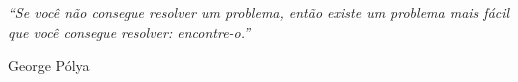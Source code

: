 \null\vfill
\begin{flushright}
\begin{minipage}{0.85\textwidth}
\raggedleft
\textit{``Se você não consegue resolver um problema, então existe um problema mais fácil que você consegue resolver: encontre-o.''}

\vspace{3mm}
George Pólya
\end{minipage}
\end{flushright}
\vspace{1cm}
